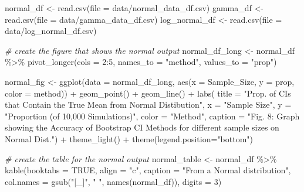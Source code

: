 \documentclass[12pt]{article}
\newenvironment{Shaded}{\begin{snugshade}}{\end{snugshade}}
\newcommand{\AttributeTok}[1]{\textcolor[rgb]{0.77,0.63,0.00}{#1}}
\newcommand{\CommentTok}[1]{\textcolor[rgb]{0.56,0.35,0.01}{\textit{#1}}}
\newcommand{\ConstantTok}[1]{\textcolor[rgb]{0.00,0.00,0.00}{#1}}
\newcommand{\DecValTok}[1]{\textcolor[rgb]{0.00,0.00,0.81}{#1}}
\newcommand{\FunctionTok}[1]{\textcolor[rgb]{0.00,0.00,0.00}{#1}}
\newcommand{\NormalTok}[1]{#1}
\newcommand{\OtherTok}[1]{\textcolor[rgb]{0.56,0.35,0.01}{#1}}
\newcommand{\SpecialCharTok}[1]{\textcolor[rgb]{0.00,0.00,0.00}{#1}}
\newcommand{\StringTok}[1]{\textcolor[rgb]{0.31,0.60,0.02}{#1}}
\begin{document}
\begin{Shaded}
\begin{Highlighting}[]
\NormalTok{normal\_df }\OtherTok{\textless{}{-}} \FunctionTok{read.csv}\NormalTok{(}\AttributeTok{file =} \StringTok{\textquotesingle{}data/normal\_data\_df.csv\textquotesingle{}}\NormalTok{)}
\NormalTok{gamma\_df }\OtherTok{\textless{}{-}} \FunctionTok{read.csv}\NormalTok{(}\AttributeTok{file =} \StringTok{\textquotesingle{}data/gamma\_data\_df.csv\textquotesingle{}}\NormalTok{)}
\NormalTok{log\_normal\_df }\OtherTok{\textless{}{-}} \FunctionTok{read.csv}\NormalTok{(}\AttributeTok{file =} \StringTok{\textquotesingle{}data/log\_normal\_df.csv\textquotesingle{}}\NormalTok{)}

\CommentTok{\# create the figure that shows the normal output }
\NormalTok{normal\_df\_long }\OtherTok{\textless{}{-}}\NormalTok{ normal\_df }\SpecialCharTok{\%\textgreater{}\%}
  \FunctionTok{pivot\_longer}\NormalTok{(}\AttributeTok{cols =} \DecValTok{2}\SpecialCharTok{:}\DecValTok{5}\NormalTok{, }\AttributeTok{names\_to =} \StringTok{"method"}\NormalTok{, }\AttributeTok{values\_to =} \StringTok{"prop"}\NormalTok{) }
    
\NormalTok{normal\_fig }\OtherTok{\textless{}{-}} \FunctionTok{ggplot}\NormalTok{(}\AttributeTok{data =}\NormalTok{ normal\_df\_long, }
                    \FunctionTok{aes}\NormalTok{(}\AttributeTok{x =}\NormalTok{ Sample\_Size, }\AttributeTok{y =}\NormalTok{ prop, }\AttributeTok{color =}\NormalTok{ method)) }\SpecialCharTok{+} 
  \FunctionTok{geom\_point}\NormalTok{() }\SpecialCharTok{+} \FunctionTok{geom\_line}\NormalTok{() }\SpecialCharTok{+} 
  \FunctionTok{labs}\NormalTok{(}
    \AttributeTok{title =} \StringTok{"Prop. of CIs that Contain the True Mean from Normal Distibution"}\NormalTok{, }
    \AttributeTok{x =} \StringTok{"Sample Size"}\NormalTok{, }
    \AttributeTok{y =} \StringTok{"Proportion (of 10,000 Simulations)"}\NormalTok{, }\AttributeTok{color =} \StringTok{"Method"}\NormalTok{,}
    \AttributeTok{caption =} \StringTok{"Fig. 8: Graph showing the Accuracy of Bootstrap CI Methods for}
\StringTok{       different sample sizes on Normal Dist."}\NormalTok{) }\SpecialCharTok{+}
  \FunctionTok{theme\_light}\NormalTok{() }\SpecialCharTok{+}
  \FunctionTok{theme}\NormalTok{(}\AttributeTok{legend.position=}\StringTok{"bottom"}\NormalTok{)}

\CommentTok{\# create the table for the normal output}
\NormalTok{normal\_table }\OtherTok{\textless{}{-}}\NormalTok{ normal\_df }\SpecialCharTok{\%\textgreater{}\%}
  \FunctionTok{kable}\NormalTok{(}\AttributeTok{booktabs =} \ConstantTok{TRUE}\NormalTok{, }\AttributeTok{align =} \StringTok{"c"}\NormalTok{, }
        \AttributeTok{caption =} \StringTok{"From a Normal distribution"}\NormalTok{, }
        \AttributeTok{col.names =} \FunctionTok{gsub}\NormalTok{(}\StringTok{"[\_]"}\NormalTok{, }\StringTok{" "}\NormalTok{, }\FunctionTok{names}\NormalTok{(normal\_df)), }\AttributeTok{digits =} \DecValTok{3}\NormalTok{)}


\end{Highlighting}
\end{Shaded}
\end{document}
